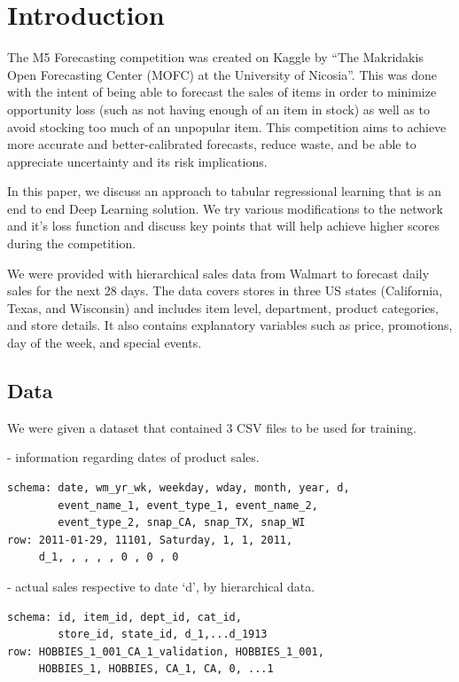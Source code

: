 \documentclass[10pt,twocolumn,letterpaper]{article}
\begin{document}
\section{Introduction}
The M5 Forecasting competition was created on Kaggle by ``The Makridakis Open
Forecasting Center (MOFC) at the University of Nicosia''. This was done with the
intent of being able to forecast the sales of items in order to minimize
opportunity loss (such as not having enough of an item in stock) as well as to
avoid stocking too much of an unpopular item. This competition aims to achieve
more accurate and better-calibrated forecasts, reduce waste, and be able to
appreciate uncertainty and its risk implications. \cite{kaggle}

In this paper, we discuss an approach to tabular regressional learning that is
an end to end Deep Learning solution. We try various modifications to the
network and it's loss function and discuss key points that will help achieve
higher scores during the competition.

We were provided with hierarchical sales data from Walmart to forecast daily
sales for the next 28 days. The data covers stores in three US states
(California, Texas, and Wisconsin) and includes item level, department, product
categories, and store details. It also contains explanatory variables such as
price, promotions, day of the week, and special events.



\subsection{Data}
  We were given a dataset that contained 3 CSV files to be
  used for training.\cite{kaggle}

   - information regarding dates of product sales.
{\scriptsize\begin{verbatim}
schema: date, wm_yr_wk, weekday, wday, month, year, d,
        event_name_1, event_type_1, event_name_2,
        event_type_2, snap_CA, snap_TX, snap_WI
row: 2011-01-29, 11101, Saturday, 1, 1, 2011,
     d_1, , , , , 0 , 0 , 0
\end{verbatim}}

   - actual sales respective to date ‘d’, by hierarchical data.
  {\scriptsize\begin{verbatim}
schema: id, item_id, dept_id, cat_id,
        store_id, state_id, d_1,...d_1913
row: HOBBIES_1_001_CA_1_validation, HOBBIES_1_001,
     HOBBIES_1, HOBBIES, CA_1, CA, 0, ...1
  \end{verbatim}}
\end{document}

